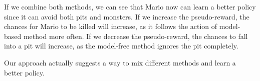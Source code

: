 If we combine both methods, we can see that Mario now can learn a better policy since
it can avoid both pits and monsters.
If we increase the pseudo-reward, the chances for Mario to be killed will increase, as it follows
the action of model-based method more often.
If we decrease the pseudo-reward, the chances to fall into a pit will increase, as the model-free  
method ignores the pit completely.

Our approach actually suggests a way to mix different methods and learn a better policy.
\ \\
\ \\
\ \\
\ \\
\ \\
\ \\
\ \\
\ \\
\ \\
\ \\
\ \\
\ \\
\ \\
\ \\
\ \\
\ \\
\ \\
\ \\
\ \\
\ \\
\ \\
\ \\
\ \\
\ \\
\ \\
\ \\
\ \\
\ \\
\ \\
\ \\
\ \\
\ \\
\ \\
\ \\
\ \\
\ \\
\ \\
\ \\
\ \\
\ \\
\ \\
\ \\
\ \\
\ \\
\ \\
\ \\
